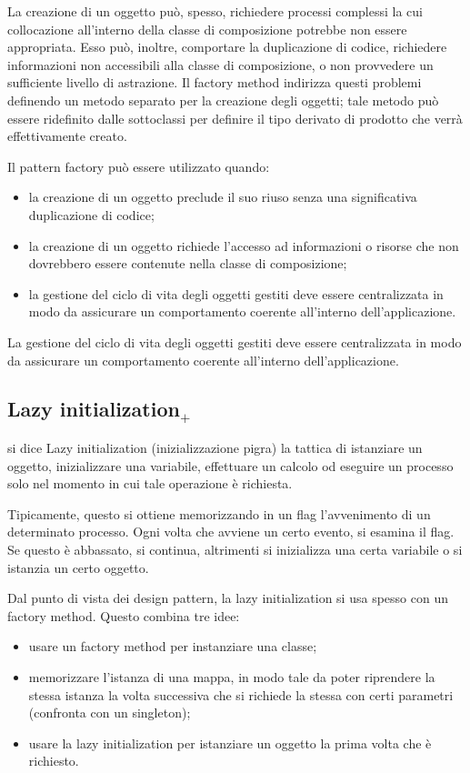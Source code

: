 La creazione di un oggetto può, spesso, richiedere processi complessi la cui collocazione all'interno della classe di composizione potrebbe non essere appropriata. Esso può, inoltre, comportare la duplicazione di codice, richiedere informazioni non accessibili alla classe di composizione, o non provvedere un sufficiente livello di astrazione. Il factory method indirizza questi problemi definendo un metodo separato per la creazione degli oggetti; tale metodo può essere ridefinito dalle sottoclassi per definire il tipo derivato di prodotto che verrà effettivamente creato.

Il pattern factory può essere utilizzato quando:
\begin{itemize}
	\item la creazione di un oggetto preclude il suo riuso senza una significativa duplicazione di codice;
	\item la creazione di un oggetto richiede l'accesso ad informazioni o risorse che non dovrebbero essere contenute nella classe di composizione;
	\item la gestione del ciclo di vita degli oggetti gestiti deve essere centralizzata in modo da assicurare un comportamento coerente all'interno dell'applicazione.
\end{itemize}
La gestione del ciclo di vita degli oggetti gestiti deve essere centralizzata in modo da assicurare un comportamento coerente all'interno dell'applicazione.

\subsection{Lazy initialization$_+$}
si dice Lazy initialization (inizializzazione pigra) la tattica di istanziare un oggetto, inizializzare una variabile, effettuare un calcolo od eseguire un processo solo nel momento in cui tale operazione è richiesta.

Tipicamente, questo si ottiene memorizzando in un flag l'avvenimento di un determinato processo. Ogni volta che avviene un certo evento, si esamina il flag. Se questo è abbassato, si continua, altrimenti si inizializza una certa variabile o si istanzia un certo oggetto.

Dal punto di vista dei design pattern, la lazy initialization si usa spesso con un factory method. Questo combina tre idee:
\begin{itemize}
	\item usare un factory method per instanziare una classe;
	\item memorizzare l'istanza di una mappa, in modo tale da poter riprendere la stessa istanza la volta successiva che si richiede la stessa con certi parametri (confronta con un singleton);
	\item usare la lazy initialization per istanziare un oggetto la prima volta che è richiesto.
\end{itemize}


